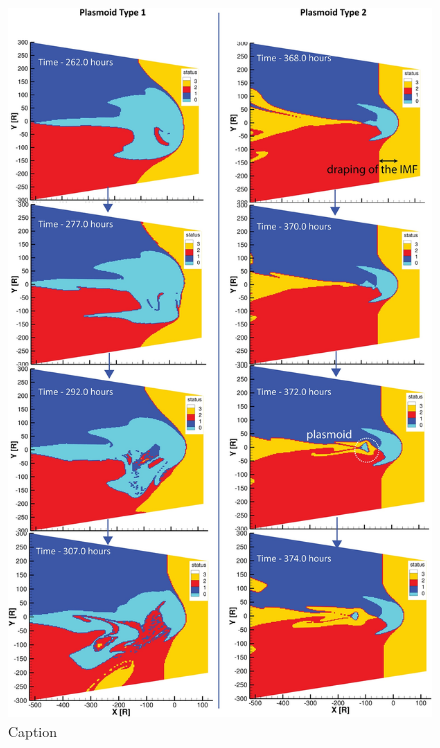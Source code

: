 \begin{figure}
    \centering
    \includegraphics[height=0.9\textheight]{images4/status-fieldlines-magnetosphere.jpg}
    \caption{Caption}
    \label{fig:status-magnetosphere}
\end{figure}

